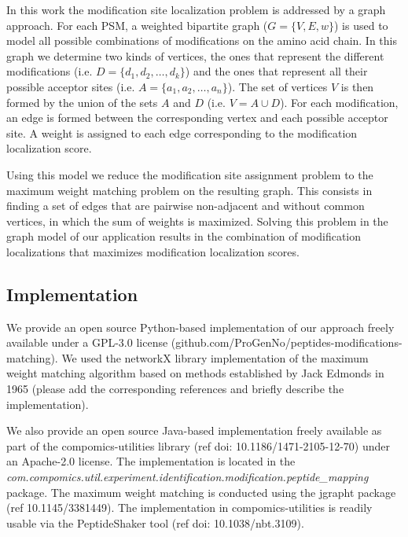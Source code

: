 \documentclass[]{article}
\begin{document}
In this work the modification site localization problem is addressed by a graph approach. For each PSM, a weighted bipartite graph ($G = \{V,E,w\}$) is used to model all possible combinations of modifications on the amino acid chain. In this graph we determine two kinds of vertices, the ones that represent the different modifications (i.e. $D = \{d_1, d_2, \dots, d_k\}$) and the ones that represent all their possible acceptor sites (i.e. $A = \{a_1, a_2, \dots, a_n\}$). The set of vertices $V$ is then formed by the union of the sets $A$ and $D$ (i.e. $V = A \cup D$). For each modification, an edge is formed between the corresponding vertex and each possible acceptor site. A weight is assigned to each edge corresponding to the modification localization score.

Using this model we reduce the modification site assignment problem to the maximum weight matching problem on the resulting graph. This consists in finding a set of edges that are pairwise non-adjacent and without common vertices, in which the sum of weights is maximized. Solving this problem in the graph model of our application results in the combination of modification localizations that maximizes modification localization scores. 



\subsection{Implementation}

We provide an open source Python-based implementation of our approach freely available under a GPL-3.0 license (github.com/ProGenNo/peptides-modifications-matching). We used the networkX library implementation of the maximum weight matching algorithm based on methods established by Jack Edmonds in 1965 \alert{(please add the corresponding references and briefly describe the implementation)}.

We also provide an open source Java-based implementation freely available as part of the compomics-utilities library (ref doi: 10.1186/1471-2105-12-70) under an Apache-2.0 license. The implementation is located in the \textit{com.compomics.util.experiment.identification.modification.peptide\_mapping} package. The maximum weight matching is conducted using the jgrapht package (ref 10.1145/3381449). The implementation in compomics-utilities is readily usable via the PeptideShaker tool (ref doi: 10.1038/nbt.3109).

\end{document}
